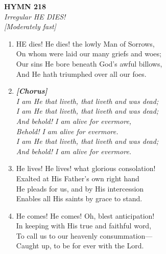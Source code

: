 \documentclass[11pt,a4paper]{article}
\begin{document}
\newpage
\begin{center}
    {\Large \textbf{HYMN 218}}
    \\
    \textit{Irregular HE DIES!}
    \\
    \textit{\small [Moderately fast]}
\end{center}
\vspace{1em}

\begin{enumerate}
    \item HE dies! He dies! the lowly Man of Sorrows, \\
        On whom were laid our many griefs and woes; \\
        Our sins He bore beneath God's awful billows, \\
        And He hath triumphed over all our foes.

    \item[] \vspace{0.4em}
    \textbf{\textit{[Chorus]}} \\
    \textit{I am He that liveth, that liveth and was dead;} \\
    \textit{I am He that liveth, that liveth and was dead;} \\
    \textit{    And behold! I am alive for evermore,} \\
    \textit{    Behold! I am alive for evermore.} \\
    \textit{I am He that liveth, that liveth and was dead;} \\
    \textit{    And behold! I am alive for evermore.}
    \vspace{0.4em}

    \item He lives! He lives! what glorious consolation! \\
        Exalted at His Father's own right hand \\
        He pleads for us, and by His intercession \\
        Enables all His saints by grace to stand.

    \item He comes! He comes! Oh, blest anticipation! \\
        In keeping with His true and faithful word, \\
        To call us to our heavenly consummation--- \\
        Caught up, to be for ever with the Lord.

\end{enumerate}
\end{document}
